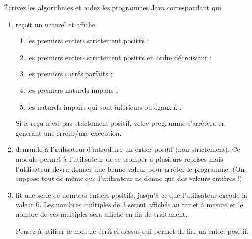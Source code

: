 \documentclass[11pt,a4paper]{article}
\begin{document}
            \par
        
        \'Ecrivez les algorithmes et codez les programmes Java correspondant qui 
          
					\begin{enumerate}
				
			\item re\c coit un naturel \verb@n@ et affiche
              
					\begin{enumerate}
				
			\item les \verb@n@ premiers entiers strictement positifs ;
			\item les \verb@n@ premiers entiers strictement positifs en ordre d\'ecroissant ;
			\item les \verb@n@ premiers carr\'es parfaits ;
			\item les \verb@n@ premiers naturels impairs ;
			\item les naturels impairs qui sont inf\'erieurs ou \'egaux \`a \verb@n@.
					\end{enumerate}
				
              Si le \verb@n@ re\c cu n'est pas strictement positif, votre programme s'arr\^etera en g\'en\'erant une erreur/une exception.
            
			\item 
              demande \`a l'utilisateur d'introduire un entier positif (non strictement). 
              Ce module permet \`a l'utilisateur de se tromper \`a plusieurs reprises mais l'utilisateur devra donner
              une bonne valeur pour arr\^eter le programme.
              (On suppose tout de m\^eme que l'utilisateur ne donne que des valeurs enti\`eres !) 
            
			\item 
              lit une s\'erie de nombres entiers positifs, jusqu'\`a ce que l'utilisateur
              encode la valeur 0. Les nombres multiples de 3 seront affich\'es au fur et \`a mesure et le nombre
              de ces multiples sera affich\'e en fin de traitement.
              
            \par
        
              Pensez \`a utiliser le module \'ecrit ci-dessus qui permet de lire un entier positif.
              
            \par
        

\end{enumerate}
\end{document}
